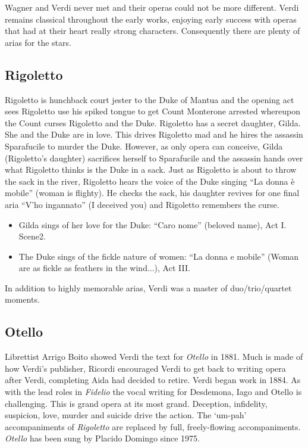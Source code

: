 Wagner and Verdi never met and their operas could not be more different. Verdi remains classical throughout the early works, enjoying early success with operas that had at their heart really strong characters. Consequently there are plenty of arias for the stars. 

\subsection{Rigoletto}
Rigoletto is hunchback court jester to the Duke of Mantua and the opening act sees Rigoletto use his spiked 
tongue to get Count Monterone arrested whereupon the Count curses Rigoletto and the Duke. Rigoletto has a 
secret daughter, Gilda. She and the Duke are in love. This drives Rigoletto mad and he hires the assassin 
Sparafucile to murder the Duke. However, as only opera can conceive, Gilda (Rigoletto's daughter) sacrifices 
herself to Sparafucile and the assassin hands over what Rigoletto thinks is the Duke in a sack. Just as 
Rigoletto is about to throw the sack in the river, Rigoletto hears the voice of the Duke singing ``La donna 
\`e mobile'' (woman is flighty). He checks the sack, his daughter revives for one final aria ``V'ho 
ingannato'' (I deceived you) and Rigoletto remembers the curse. 

\begin{itemize}
\item Gilda sings of her love for the Duke: ``Caro nome'' (beloved name), Act I. Scene2. 
\item The Duke sings of the fickle nature of women: ``La donna e mobile'' (Woman are as fickle as feathers in the wind...), Act III. 
\end{itemize}

In addition to highly memorable arias, Verdi was a master of duo/trio/quartet moments.

\subsection{Otello}
Librettist Arrigo Boito showed Verdi the text for \textit{Otello} in 1881. Much is made of how Verdi's publisher, Ricordi encouraged Verdi to get back to writing opera after Verdi, completing Aida had decided to retire. Verdi began work in 1884. As with the lead roles in \textit{Fidelio} the vocal writing for Desdemona, Iago and Otello is challenging. This is grand opera at its most grand. Deception, infidelity, suspicion, love, murder and suicide drive the action. The `um-pah' accompaniments of \textit{Rigoletto} are replaced by full, freely-flowing accompaniments. \textit{Otello} has been sung by Placido Domingo since 1975.

